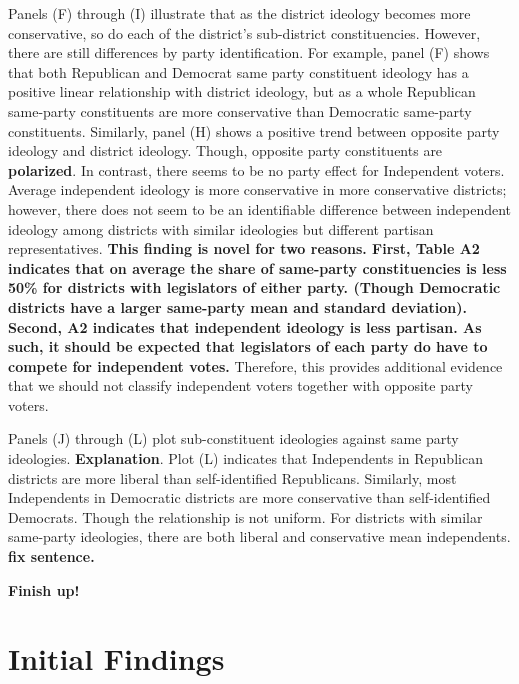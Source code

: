 \documentclass[10pt,letterpaper]{article}
\begin{document}
Panels (F) through (I) illustrate that as the district ideology becomes more conservative, so do each of the district's sub-district constituencies. However, there are still differences by party identification. For example, panel (F) shows that both Republican and Democrat same party constituent ideology has a positive linear relationship with district ideology, but as a whole Republican same-party constituents are more conservative than Democratic same-party constituents. Similarly, panel (H) shows a positive trend between opposite party ideology and district ideology. Though, opposite party constituents are \textbf{polarized}. In contrast, there seems to be no party effect for Independent voters. Average independent ideology is more conservative in more conservative districts; however, there does not seem to be an identifiable difference between independent ideology among districts with similar ideologies but different partisan representatives. \textbf{This finding is novel for two reasons. First, Table A2 indicates that on average the share of same-party constituencies is less 50\% for districts with legislators of either party. (Though Democratic districts have a larger same-party mean and standard deviation). Second, A2 indicates that independent ideology is less partisan. As such, it should be expected that legislators of each party do have to compete for independent votes.} Therefore, this provides additional evidence that we should not classify independent voters together with opposite party voters.

Panels (J) through (L) plot sub-constituent ideologies against same party ideologies. \textbf{Explanation}. Plot (L) indicates that Independents in Republican districts are more liberal than self-identified Republicans. Similarly, most Independents in Democratic districts are more conservative than self-identified Democrats. Though the relationship is not uniform. For districts with similar same-party ideologies, there are both liberal and conservative mean independents. \textbf{fix sentence.}

\textbf{Finish up!}


\newpage
 
\newpage

\section{Initial Findings} 
\end{document}
